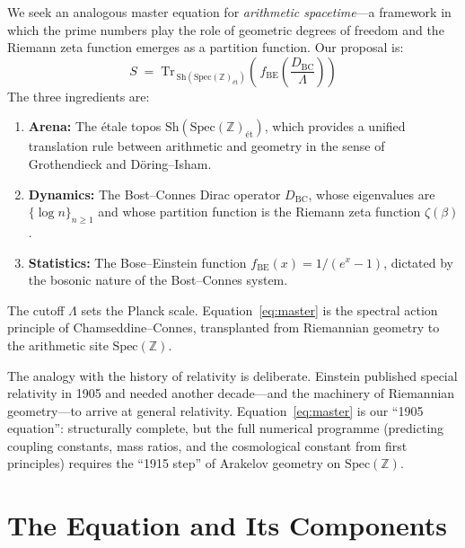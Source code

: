 \documentclass[11pt,a4paper]{article}
\begin{document}
We seek an analogous master equation for \emph{arithmetic spacetime}---a
framework in which the prime numbers play the role of geometric degrees of
freedom and the Riemann zeta function emerges as a partition function. Our
proposal is:
\begin{equation}\label{eq:master}
  \boxed{\;
  S \;=\; \mathrm{Tr}_{\,\mathrm{Sh}(\mathrm{Spec}(\mathbb{Z})_{\text{\'et}})}
  \!\left(\, f_{\mathrm{BE}}\!\left(\frac{D_{\mathrm{BC}}}{\Lambda}\right)\right)
  \;}
\end{equation}
The three ingredients are:
\begin{enumerate}
  \item \textbf{Arena:} The \'etale topos
    $\mathrm{Sh}(\mathrm{Spec}(\mathbb{Z})_{\text{\'et}})$, which provides
    a unified translation rule between arithmetic and geometry in the sense
    of Grothendieck and D\"oring--Isham.
  \item \textbf{Dynamics:} The Bost--Connes Dirac operator $D_{\mathrm{BC}}$,
    whose eigenvalues are $\{\log n\}_{n \geq 1}$ and whose partition function
    is the Riemann zeta function $\zeta(\beta)$.
  \item \textbf{Statistics:} The Bose--Einstein function
    $f_{\mathrm{BE}}(x) = 1/(e^x - 1)$, dictated by the bosonic nature of
    the Bost--Connes system.
\end{enumerate}
The cutoff $\Lambda$ sets the Planck scale. Equation~\eqref{eq:master}
is the spectral action principle of Chamseddine--Connes, transplanted from
Riemannian geometry to the arithmetic site $\mathrm{Spec}(\mathbb{Z})$.

The analogy with the history of relativity is deliberate. Einstein published
special relativity in 1905 and needed another decade---and the machinery of
Riemannian geometry---to arrive at general relativity. Equation~\eqref{eq:master}
is our ``1905 equation'': structurally complete, but the full numerical
programme (predicting coupling constants, mass ratios, and the cosmological
constant from first principles) requires the ``1915 step'' of Arakelov
geometry on $\mathrm{Spec}(\mathbb{Z})$.

\section{The Equation and Its Components}
\label{sec:equation}
\end{document}
